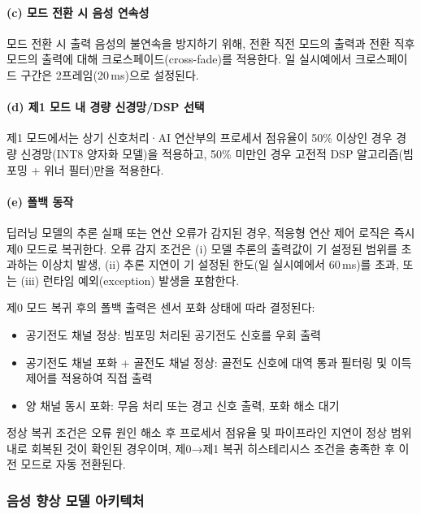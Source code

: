 \documentclass{article}
\begin{document}
\paragraph{(c) 모드 전환 시 음성 연속성}

모드 전환 시 출력 음성의 불연속을 방지하기 위해, 전환 직전 모드의 출력과 전환 직후 모드의 출력에 대해 크로스페이드(cross-fade)를 적용한다. 일 실시예에서 크로스페이드 구간은 2프레임(20\,ms)으로 설정된다.

\paragraph{(d) 제1 모드 내 경량 신경망/DSP 선택}

제1 모드에서는 상기 신호처리·AI 연산부의 프로세서 점유율이 50\% 이상인 경우 경량 신경망(INT8 양자화 모델)을 적용하고, 50\% 미만인 경우 고전적 DSP 알고리즘(빔포밍 + 위너 필터)만을 적용한다.

\paragraph{(e) 폴백 동작}

딥러닝 모델의 추론 실패 또는 연산 오류가 감지된 경우, 적응형 연산 제어 로직은 즉시 제0 모드로 복귀한다. 오류 감지 조건은 (i) 모델 추론의 출력값이 기 설정된 범위를 초과하는 이상치 발생, (ii) 추론 지연이 기 설정된 한도(일 실시예에서 60\,ms)를 초과, 또는 (iii) 런타임 예외(exception) 발생을 포함한다.

제0 모드 복귀 후의 폴백 출력은 센서 포화 상태에 따라 결정된다:
\begin{itemize}
    \item 공기전도 채널 정상: 빔포밍 처리된 공기전도 신호를 우회 출력
    \item 공기전도 채널 포화 + 골전도 채널 정상: 골전도 신호에 대역 통과 필터링 및 이득 제어를 적용하여 직접 출력
    \item 양 채널 동시 포화: 무음 처리 또는 경고 신호 출력, 포화 해소 대기
\end{itemize}

정상 복귀 조건은 오류 원인 해소 후 프로세서 점유율 및 파이프라인 지연이 정상 범위 내로 회복된 것이 확인된 경우이며, 제0→제1 복귀 히스테리시스 조건을 충족한 후 이전 모드로 자동 전환된다.

\subsubsection{음성 향상 모델 아키텍처}
\end{document}
